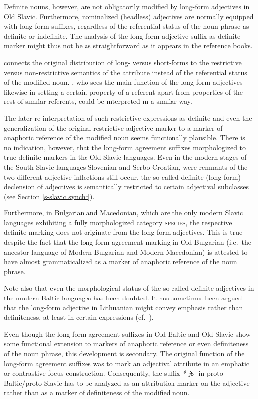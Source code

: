 Definite nouns, however, are not obligatorily modified by long-form adjectives in Old Slavic. Furthermore, nominalized (headless) adjectives are normally equipped with long-form suffixes, regardless of the referential status of the noun phrase as definite or indefinite. The analysis of the long-form adjective suffix as definite marker might thus not be as straightforward as it appears in the reference books. 

\citet[214–215]{mendoza2004} connects the original distribution of long- versus short-forms to the restrictive versus non-restrictive semantics of the attribute instead of the referential status of the modified noun. \citet{tolstoj1957}, who sees the main function of the long-form adjectives likewise in setting a certain property of a referent apart from properties of the rest of similar referents, could be interpreted in a similar way.

The later re-interpretation of such restrictive expressions as definite and even the generalization of the original restrictive adjective marker to a marker of anaphoric reference of the modified noun seems functionally plausible. There is no indication, however, that the long-form agreement suffixes morphologized to true definite markers in the Old Slavic languages. Even in the modern stages of the South-Slavic languages Slovenian and Serbo-Croatian, were remnants of the two different adjective inflections still occur, the so-called definite (long-form) declension of adjectives is semantically restricted to certain adjectival subclasses (see Section \ref{s-slavic synchr}). 

Furthermore, in Bulgarian and Macedonian, which are the only modern Slavic languages exhibiting a fully morphologized category \textsc{species}, the respective definite marking does not originate from the long-form adjectives. This is true despite the fact that the long-form agreement marking in Old Bulgarian (i.e.~the ancestor language of Modern Bulgarian and Modern Macedonian) is attested to have almost grammaticalized as a marker of anaphoric reference of the noun phrase.

Note also that even the morphological status of the so-called definite adjectives in the modern Baltic languages has been doubted. It has sometimes been argued that the long-form adjective in Lithuanian might convey emphasis rather than definiteness, at least in certain expressions (cf.~\citealt[181–182]{kramsky1972}).

Even though the long-form agreement suffixes in Old Baltic and Old Slavic show some functional extension to markers of anaphoric reference or even definiteness of the noun phrase, this development is secondary. The original function of the long-form agreement suffixes was to mark an adjectival attribute in an emphatic or contrastive-focus construction. Consequently, the suffix \textit{*-jь-} in proto-Baltic/proto-Slavic has to be analyzed as an attribution marker on the adjective rather than as a marker of definiteness of the modified noun.

